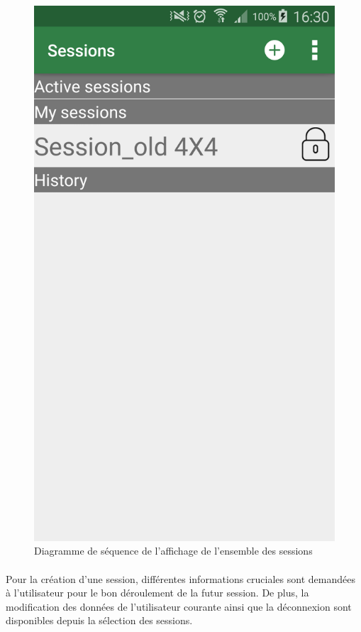 \documentclass[titlepage, 12pt]{report}
\begin{document}
\begin{figure}[!h]
	\caption{Diagramme de séquence de l'affichage de l'ensemble des sessions}
	\label{screenshots_list_session}
	\centering
	\includegraphics[scale=0.2]{Images/screenshots/list_sessions.png}
\end{figure}

\clearpage

\paragraph{}Pour la création d'une session, différentes informations cruciales sont demandées à l'utilisateur pour le bon déroulement de la futur session.
De plus, la modification des données de l'utilisateur courante ainsi que la déconnexion sont disponibles depuis la sélection des sessions.
\end{document}
